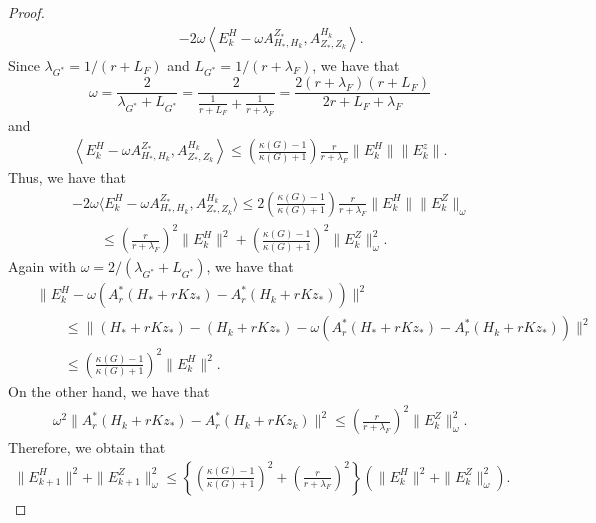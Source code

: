 \begin{itemize}
\begin{proof}
\begin{eqnarray*}
&& -2 \omega \left \langle E_k^H - \omega A_{H_*,H_k}^{Z_*}, A_{Z_*,Z_k}^{H_k} \right \rangle.  
\end{eqnarray*}
Since $\lambda_{G^*} = 1/(r + L_F)$ and $L_{G^*} = 1/(r + \lambda_F)$, we have that 
\begin{equation}
\omega = \frac{2}{\lambda_{G^*} + L_{G^*}} = \frac{2}{\frac{1}{r + L_F} + \frac{1}{r + \lambda_F}} = \frac{2 (r + \lambda_F)(r + L_F)}{2r + L_F + \lambda_F}  
\end{equation} 
and 
\begin{eqnarray*}
\left \langle E_k^H - \omega A_{H_*,H_k}^{Z_*}, A_{Z_*,Z_k}^{H_k} \right \rangle \leq \left ( \frac{\kappa(G) - 1}{\kappa(G) + 1} \right ) \frac{r}{r+\lambda_F} \|E_k^H\|\|E_k^z\|.  
\end{eqnarray*}
Thus, we have that 
\begin{eqnarray}\label{main:ineq}
&& - 2 \omega \langle E_k^H - \omega A_{H_*,H_k}^{Z_*}, A_{Z_*,Z_k}^{H_k} \rangle \leq 2 \left ( \frac{\kappa(G) - 1}{\kappa(G) + 1} \right ) \frac{r}{r+\lambda_F}  \|E_k^H\|\|E_k^Z\|_{\omega} \label{main:1eq} \\ 
&& \qquad \leq \left ( \frac{r}{r + \lambda_F} \right )^2 \|E_k^H\|^2 + \left ( \frac{\kappa(G) - 1}{\kappa(G) + 1} \right )^2 \|E_k^Z\|_{\omega}^2. \label{main:2eq}   
\end{eqnarray}
Again with $\omega = 2/(\lambda_{G^*} + L_{G^*})$, we have that 
\begin{eqnarray*}
&& \|E_k^H - \omega (A_r^{*} (H_* + rK z_*) - A_r^*(H_k + rKz_*))\|^2 \\  && \qquad \leq \|(H_* + rKz_*) - (H_k + rKz_*) - \omega (A_r^{*} (H_* + rK z_*) - A_r^*(H_k + rKz_*))\|^2 \\
&& \qquad \leq \left ( \frac{\kappa(G) - 1}{\kappa(G) + 1} \right )^2 \|E_k^H\|^2. 
\end{eqnarray*}
On the other hand, we have that 
\begin{eqnarray*}
\omega^2 \|A_r^*(H_k + r Kz_*) - A_r^{*} (H_k + r K z_k)\|^2 \leq \left ( \frac{r}{r+\lambda_F} \right )^2 \|E_k^Z\|_\omega^2. 
\end{eqnarray*}
Therefore, we obtain that 
\begin{eqnarray*}
\|E_{k+1}^H\|^2 + \|E_{k+1}^Z\|^2_{\omega} \leq \left \{ \left ( \frac{\kappa(G) - 1}{\kappa(G) + 1} \right )^2 + \left ( \frac{r}{r + \lambda_F} \right )^2 \right \} \left ( \|E_k^H\|^2 + \|E_k^Z\|^2_{\omega} \right ).  
\end{eqnarray*}
\begin{comment} 

\end{comment}
\end{proof}
\end{itemize}
